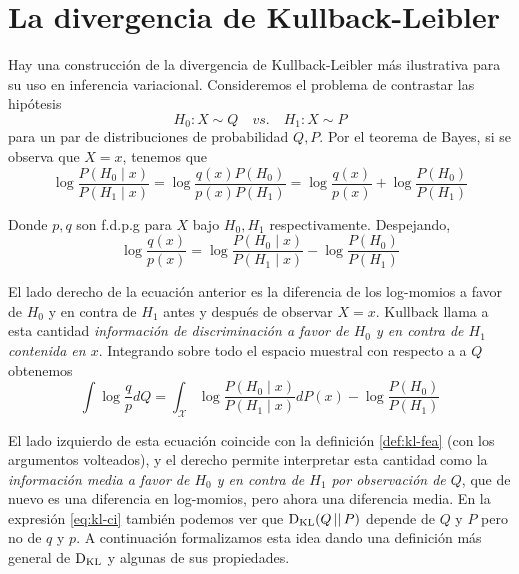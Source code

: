 \documentclass[main.tex]{subfiles}
\begin{document}
\section{La divergencia de Kullback-Leibler}
Hay una construcción de la divergencia de Kullback-Leibler  más ilustrativa para
su uso en inferencia variacional. Consideremos el problema de contrastar las
hipótesis 
\begin{equation*}
	H_0: X \sim Q \quad vs.\quad H_1: X \sim P
\end{equation*}
para un par de distribuciones de probabilidad $Q, P$. Por el teorema de Bayes,
si se observa que $X=x$, tenemos que
\begin{equation*}
\log\frac{P(H_0\mid x)}{P(H_1\mid x)} = 
	\log\frac{q(x)P(H_0)}{p(x)P(H_1)} =
	\log\frac{q(x)}{p(x)}+\log\frac{P(H_0)}{P(H_1)}
\end{equation*}

Donde $p, q$ son f.d.p.g para $X$ bajo $H_0, H_1$ respectivamente. Despejando,
\begin{equation*}
	\log\frac{q(x)}{p(x)} = \log\frac{P(H_0\mid x)}{P(H_1\mid x)} - 
	\log\frac{P(H_0)}{P(H_1)}
\end{equation*}

El lado derecho de la ecuación anterior es la diferencia de los log-momios a
favor de $H_0$ y en contra de $H_1$ antes y después de observar $X=x$. Kullback
llama a esta cantidad \textit{información de discriminación a favor de $H_0$ y
en contra de $H_1$ contenida en $x$}. Integrando sobre todo el espacio muestral
con respecto a a $Q$ obtenemos 
\begin{equation}\label{eq:kl-ci}
\int\log\frac{q}{p}dQ = \int_\mathcal{X}\log\frac{P(H_0\mid x)}{P(H_1\mid x)}dP(x)-\log\frac{P(H_0)}{P(H_1)}
\end{equation}

El lado izquierdo de esta ecuación coincide con la definición \ref{def:kl-fea}
(con los argumentos volteados), y el derecho permite interpretar esta cantidad
como la \textit{información media a favor de $H_0$ y en contra de $H_1$ por
observación de $Q$}, que de nuevo es una diferencia en log-momios, pero ahora
una diferencia media. En la expresión \eqref{eq:kl-ci} también podemos ver que
$\operatorname*{D_{KL}}(Q\operatorname*{\mid\mid} P)$ depende de $Q$ y $P$ pero no de $q$ y $p$. A continuación
formalizamos esta idea dando una definición más general de $\operatorname*{D_{KL}}$ y algunas de
sus propiedades.
\end{document}
